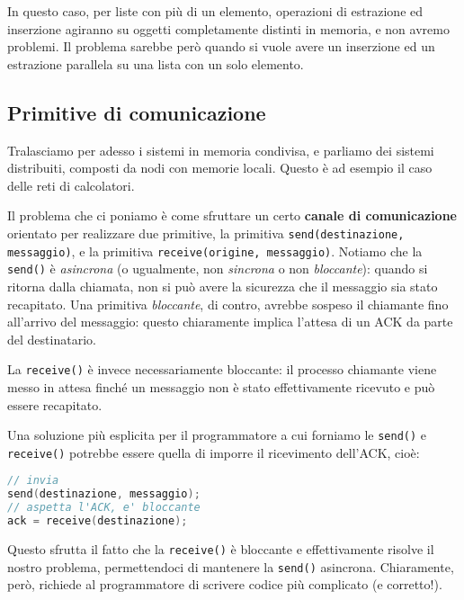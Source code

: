 \documentclass[a4paper,11pt]{article}
\begin{document}
In questo caso, per liste con più di un elemento, operazioni di estrazione ed inserzione agiranno su oggetti completamente distinti in memoria, e non avremo problemi.
Il problema sarebbe però quando si vuole avere un inserzione ed un estrazione parallela su una lista con un solo elemento.

\subsection{Primitive di comunicazione}
Tralasciamo per adesso i sistemi in memoria condivisa, e parliamo dei sistemi distribuiti, composti da nodi con memorie locali. Questo è ad esempio il caso delle reti di calcolatori.

Il problema che ci poniamo è come sfruttare un certo \textbf{canale di comunicazione} orientato per realizzare due primitive, la primitiva \lstinline|send(destinazione, messaggio)|, e la primitiva \lstinline|receive(origine, messaggio)|.
Notiamo che la \lstinline|send()| è \textit{asincrona} (o ugualmente, non \textit{sincrona} o non \textit{bloccante}): quando si ritorna dalla chiamata, non si può avere la sicurezza che il messaggio sia stato recapitato.
Una primitiva \textit{bloccante}, di contro, avrebbe sospeso il chiamante fino all'arrivo del messaggio: questo chiaramente implica l'attesa di un ACK da parte del destinatario.

La \lstinline|receive()| è invece necessariamente bloccante: il processo chiamante viene messo in attesa finché un messaggio non è stato effettivamente ricevuto e può essere recapitato. 

Una soluzione più esplicita per il programmatore a cui forniamo le \lstinline|send()| e \lstinline|receive()| potrebbe essere quella di imporre il ricevimento dell'ACK, cioè:
\begin{lstlisting}[language=C++, style=codestyle]	
// invia
send(destinazione, messaggio);
// aspetta l'ACK, e' bloccante
ack = receive(destinazione);
\end{lstlisting}
Questo sfrutta il fatto che la \lstinline|receive()| è bloccante e effettivamente risolve il nostro problema, permettendoci di mantenere la \lstinline|send()| asincrona. Chiaramente, però, richiede al programmatore di scrivere codice più complicato (e corretto!).
\end{document}
